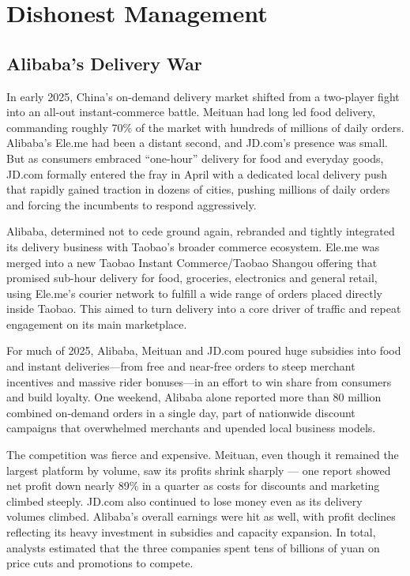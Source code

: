 \chapter{Dishonest Management}

\section{Alibaba's Delivery War}
In early 2025, China's on-demand delivery market shifted from a two-player fight into an all-out instant-commerce battle. Meituan had long led food delivery, commanding roughly 70\% of the market with hundreds of millions of daily orders. Alibaba's Ele.me had been a distant second, and JD.com's presence was small. But as consumers embraced ``one-hour'' delivery for food and everyday goods, JD.com formally entered the fray in April with a dedicated local delivery push that rapidly gained traction in dozens of cities, pushing millions of daily orders and forcing the incumbents to respond aggressively. 

Alibaba, determined not to cede ground again, rebranded and tightly integrated its delivery business with Taobao's broader commerce ecosystem. Ele.me was merged into a new Taobao Instant Commerce/Taobao Shangou offering that promised sub-hour delivery for food, groceries, electronics and general retail, using Ele.me's courier network to fulfill a wide range of orders placed directly inside Taobao. This aimed to turn delivery into a core driver of traffic and repeat engagement on its main marketplace. 

For much of 2025, Alibaba, Meituan and JD.com poured huge subsidies into food and instant deliveries—from free and near-free orders to steep merchant incentives and massive rider bonuses—in an effort to win share from consumers and build loyalty. One weekend, Alibaba alone reported more than 80 million combined on-demand orders in a single day, part of nationwide discount campaigns that overwhelmed merchants and upended local business models. 

The competition was fierce and expensive. Meituan, even though it remained the largest platform by volume, saw its profits shrink sharply — one report showed net profit down nearly 89\% in a quarter as costs for discounts and marketing climbed steeply. JD.com also continued to lose money even as its delivery volumes climbed. Alibaba’s overall earnings were hit as well, with profit declines reflecting its heavy investment in subsidies and capacity expansion. In total, analysts estimated that the three companies spent tens of billions of yuan on price cuts and promotions to compete. 

